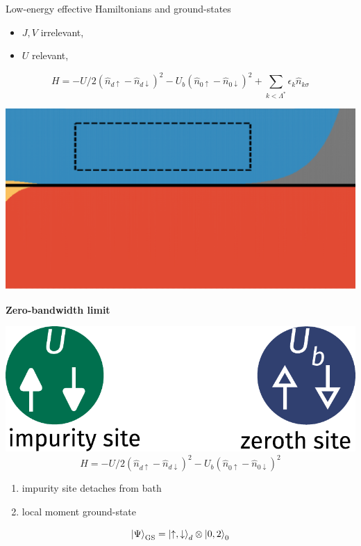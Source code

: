 \documentclass[8pt,aspectratio=169]{beamer}
\newcommand{\nitem}{\item[\ding{51}]}
\begin{document}
\begin{frame}{Low-energy effective Hamiltonians and ground-states}
{\begin{minipage}{0.4\textwidth}
\begin{itemize}
\nitem \(J,V\) irrelevant,\\[5pt]
\nitem \(U\) relevant,\\[5pt]
\end{itemize}
\[H = - U/2\left( \hat n_{d \uparrow} - \hat n_{d \downarrow} \right)^2 - U_b\left( \hat n_{0 \uparrow} - \hat n_{0 \downarrow} \right)^2 + \sum_{k < \Lambda^*}\epsilon_k \hat n_{k\sigma}\]
\end{minipage}
\hspace*{\fill}
\begin{minipage}{0.4\textwidth}
\includegraphics[width=\textwidth]{phase-map-MIT3.pdf}
\end{minipage}

\vspace*{20pt}

{\Large \bf Zero-bandwidth limit}

\begin{minipage}{0.4\textwidth}
\includegraphics[width=\textwidth]{local-moment.pdf}
\[H = - U/2\left( \hat n_{d \uparrow} - \hat n_{d \downarrow} \right)^2 - U_b\left( \hat n_{0 \uparrow} - \hat n_{0 \downarrow} \right)^2\]
\end{minipage}
\hspace*{\fill}
\begin{minipage}{0.45\textwidth}
\vspace*{\fill}
\begin{enumerate}
\nitem impurity site detaches from bath\\[6pt]
\nitem \alert{local moment} ground-state\\[10pt]
\end{enumerate}
\[\ket{\Psi}_\text{GS} = \ket{\uparrow,\downarrow}_d\otimes\ket{0,2}_0 \]
\end{minipage}
}


\end{frame}
\end{document}

